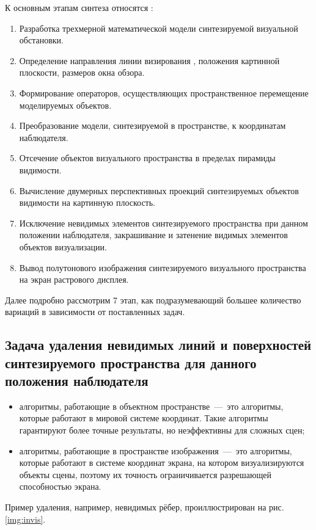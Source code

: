 К основным этапам синтеза относятся \cite{item13}:
\begin{enumerate}[label={\arabic*)}]
	\item Разработка трехмерной математической модели синтезируемой визуальной обстановки.
	\item Определение направления линии визирования , положения картинной плоскости, размеров окна обзора.
	\item Формирование операторов, осуществляющих пространственное перемещение моделируемых объектов.
	\item Преобразование модели, синтезируемой в пространстве, к координатам наблюдателя.
	\item Отсечение объектов визуального пространства в пределах пирамиды видимости.
	\item Вычисление двумерных перспективных проекций синтезируемых объектов видимости на картинную плоскость.
	\item Исключение невидимых элементов синтезируемого пространства при данном положении наблюдателя, закрашивание и затенение видимых элементов объектов визуализации.
	\item Вывод полутонового изображения синтезируемого визуального пространства на экран растрового дисплея.
\end{enumerate}

Далее подробно рассмотрим 7 этап, как подразумевающий большее количество вариаций в зависимости от поставленных задач.

\subsection{Задача удаления невидимых линий и поверхностей синтезируемого пространства для данного положения наблюдателя}
\begin{itemize}
	\item алгоритмы, работающие в объектном пространстве~---~это алгоритмы, которые работают в мировой системе координат. Такие алгоритмы гарантируют более точные результаты, но неэффективны для сложных сцен;
	\item алгоритмы, работающие в пространстве изображения~---~это алгоритмы, которые работают в системе координат экрана, на котором визуализируются объекты сцены, поэтому их точность ограничивается разрешающей способностью экрана.
\end{itemize}

Пример удаления, например, невидимых рёбер, проиллюстрирован на рис. \ref{img:invis}.

